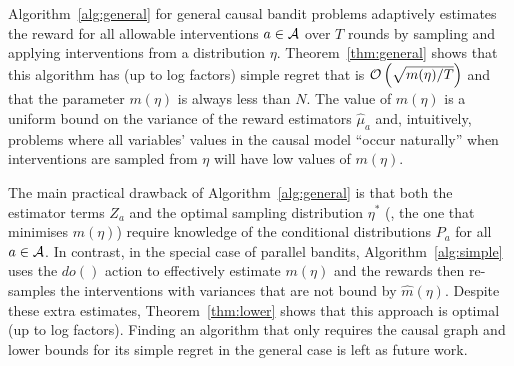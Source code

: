 Algorithm~\ref{alg:general} for general causal bandit problems adaptively estimates the reward for all allowable interventions $a \in \mathcal A$ over $T$ rounds by sampling and applying interventions from a distribution $\eta$.
Theorem~\ref{thm:general} shows that this algorithm has (up to log factors) simple regret that is $\mathcal{O}\left( \sqrt{m(\eta)/T} \right)$ and that the parameter $m(\eta)$ is always less than $N$.
The value of $m(\eta)$ is a uniform bound on the variance of the reward estimators $\hat{\mu}_a$ and, intuitively, problems where all variables' values in the causal model ``occur naturally'' when interventions are sampled from $\eta$ will have low values of $m(\eta)$.

The main practical drawback of Algorithm~\ref{alg:general} is that both the estimator terms $Z_a$ and the optimal sampling distribution $\eta^*$ (\ie, the one that minimises $m(\eta)$) require knowledge of the conditional distributions $P_a$ for all $a \in \mathcal A$.
In contrast, in the special case of parallel bandits, Algorithm~\ref{alg:simple} uses the $do()$ action to effectively estimate $m(\eta)$ and the rewards then re-samples the interventions with variances that are not bound by $\hat{m}(\eta)$.
Despite these extra estimates, Theorem~\ref{thm:lower} shows that this approach is optimal (up to log factors).
Finding an algorithm that only requires the causal graph and lower bounds for its simple regret in the general case is left as future work.

